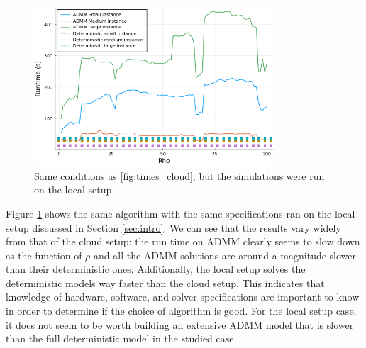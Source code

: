 \documentclass[a4paper]{artikel3}
\begin{document}
\begin{figure}[H]
\centering
\includegraphics[width=0.80\textwidth]{times_local.png}
\caption{Same conditions as \ref{fig:times_cloud}, but the simulations were run on the local setup.}
\label{fig:times_local}
\end{figure}

Figure \ref{fig:times_local} shows the same algorithm with the same specifications ran on the local setup discussed in Section \ref{sec:intro}. We can see that the results vary widely from that of the cloud setup: the run time on ADMM clearly seems to slow down as the function of $\rho$ and all the ADMM solutions are around a magnitude slower than their deterministic ones. Additionally, the local setup solves the deterministic models way faster than the cloud setup. This indicates that knowledge of hardware, software, and solver specifications are important to know in order to determine if the choice of algorithm is good. For the local setup case, it does not seem to be worth building an extensive ADMM model that is slower than the full deterministic model in the studied case.

{}

\end{document}
